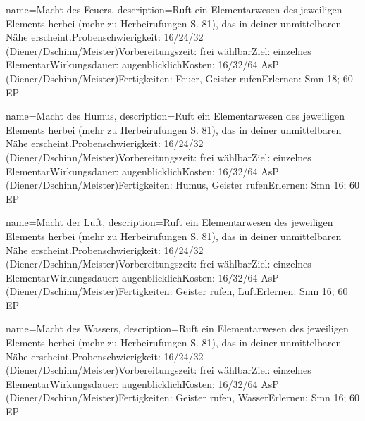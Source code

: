 {
    name={Macht des Feuers},
    description={Ruft ein Elementarwesen des jeweiligen Elements herbei (mehr zu Herbeirufungen S. 81), das in deiner unmittelbaren Nähe erscheint.\newline Probenschwierigkeit: 16/24/32 (Diener/Dschinn/Meister)\newline Vorbereitungszeit: frei wählbar\newline Ziel: einzelnes Elementar\newline Wirkungsdauer: augenblicklich\newline Kosten: 16/32/64 AsP (Diener/Dschinn/Meister)\newline Fertigkeiten: Feuer, Geister rufen\newline Erlernen: Smn 18; 60 EP}
}


{
    name={Macht des Humus},
    description={Ruft ein Elementarwesen des jeweiligen Elements herbei (mehr zu Herbeirufungen S. 81), das in deiner unmittelbaren Nähe erscheint.\newline Probenschwierigkeit: 16/24/32 (Diener/Dschinn/Meister)\newline Vorbereitungszeit: frei wählbar\newline Ziel: einzelnes Elementar\newline Wirkungsdauer: augenblicklich\newline Kosten: 16/32/64 AsP (Diener/Dschinn/Meister)\newline Fertigkeiten: Humus, Geister rufen\newline Erlernen: Smn 16; 60 EP}
}


{
    name={Macht der Luft},
    description={Ruft ein Elementarwesen des jeweiligen Elements herbei (mehr zu Herbeirufungen S. 81), das in deiner unmittelbaren Nähe erscheint.\newline Probenschwierigkeit: 16/24/32 (Diener/Dschinn/Meister)\newline Vorbereitungszeit: frei wählbar\newline Ziel: einzelnes Elementar\newline Wirkungsdauer: augenblicklich\newline Kosten: 16/32/64 AsP (Diener/Dschinn/Meister)\newline Fertigkeiten: Geister rufen, Luft\newline Erlernen: Smn 16; 60 EP}
}


{
    name={Macht des Wassers},
    description={Ruft ein Elementarwesen des jeweiligen Elements herbei (mehr zu Herbeirufungen S. 81), das in deiner unmittelbaren Nähe erscheint.\newline Probenschwierigkeit: 16/24/32 (Diener/Dschinn/Meister)\newline Vorbereitungszeit: frei wählbar\newline Ziel: einzelnes Elementar\newline Wirkungsdauer: augenblicklich\newline Kosten: 16/32/64 AsP (Diener/Dschinn/Meister)\newline Fertigkeiten: Geister rufen, Wasser\newline Erlernen: Smn 16; 60 EP}
}


